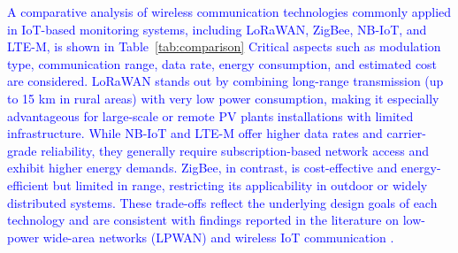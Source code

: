\documentclass{ieeeaccess}
\begin{document}
\textcolor{blue}{
A comparative analysis of wireless communication technologies commonly applied in IoT-based monitoring systems, including LoRaWAN, ZigBee, NB-IoT, and LTE-M, is shown in Table~\ref{tab:comparison} Critical aspects such as modulation type, communication range, data rate, energy consumption, and estimated cost are considered. LoRaWAN stands out by combining long-range transmission (up to 15 km in rural areas) with very low power consumption, making it especially advantageous for large-scale or remote PV plants installations with limited infrastructure. While NB-IoT and LTE-M offer higher data rates and carrier-grade reliability, they generally require subscription-based network access and exhibit higher energy demands. ZigBee, in contrast, is cost-effective and energy-efficient but limited in range, restricting its applicability in outdoor or widely distributed systems. These trade-offs reflect the underlying design goals of each technology and are consistent with findings reported in the literature on low-power wide-area networks (LPWAN) and wireless IoT communication \cite{raza2017overview, centenaro2016long, mekki2019comparative, ieee802154, zigbee2024spec, lora2021covid, maldonado2021}.
}
\end{document}

